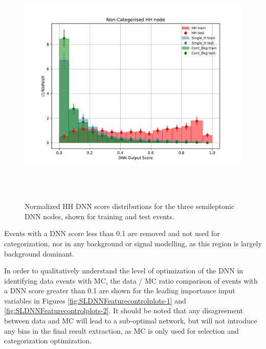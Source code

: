 \begin{figure}[H]
  \setlength{\unitlength}{1mm}
  \begin{center}
    \mbox{\includegraphics*[height=100mm]{Sections/HHWWgg/images/DNN/overfitting_plot_HH_Non-Categorised.pdf}
    }
  \end{center}
  \caption{Normalized HH DNN score distributions for the three semileptonic DNN nodes, shown for training and test events.}
  \label{fig:SL_DNN_overfitting_check}
\end{figure}





Events with a DNN score less than 0.1 are removed and not used for categorization, nor in any background or signal modelling, as this region is largely background dominant. 

In order to qualitatively understand the level of optimization of the DNN in identifying data events with MC, the data / MC ratio comparison of events with a DNN score greater than 0.1 are shown for the leading importance input variables in Figures \ref{fig:SLDNNFeaturecontrolplots-1} and \ref{fig:SLDNNFeaturecontrolplots-2}. It should be noted 
that any disagreement between data and MC will lead to a sub-optimal network, but will not introduce any bias in the final result extraction, as MC is only used for selection and categorization optimization. 

